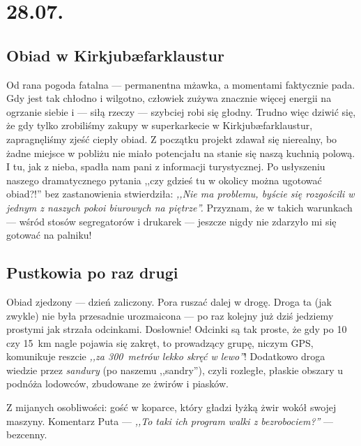 \chapter*{28.07.}

\section*{Obiad w Kirkjubæfarklaustur}

Od rana pogoda fatalna --- permanentna mżawka, a momentami faktycznie pada. Gdy jest tak chłodno i wilgotno, człowiek zużywa znacznie więcej energii na ogrzanie siebie i --- siłą rzeczy --- szybciej robi się głodny. Trudno więc dziwić się, że gdy tylko zrobiliśmy zakupy w superkarkecie w Kirkjubæfarklaustur, zapragnęliśmy zjeść ciepły obiad. Z początku projekt zdawał się nierealny, bo żadne miejsce w pobliżu nie miało potencjału na stanie się naszą kuchnią polową. I tu, jak z nieba, spadła nam pani z informacji turystycznej. Po usłyszeniu naszego dramatycznego pytania ,,czy gdzieś tu w okolicy można ugotować obiad?!'' bez zastanowienia stwierdziła: \emph{,,Nie ma problemu, byście się rozgościli w jednym z naszych pokoi biurowych na piętrze''.} Przyznam, że w takich warunkach --- wśród stosów segregatorów i drukarek --- jeszcze nigdy nie zdarzyło mi się gotować na palniku!


\section*{Pustkowia po raz drugi}

Obiad zjedzony --- dzień zaliczony. Pora ruszać dalej w drogę. Droga ta (jak zwykle) nie była przesadnie urozmaicona --- po raz kolejny już dziś jedziemy prostymi jak strzała odcinkami. Dosłownie! Odcinki są tak proste, że gdy po 10 czy 15~km nagle pojawia się zakręt, to prowadzący grupę, niczym GPS, komunikuje reszcie \emph{,,za 300~metrów lekko skręć w lewo''}! Dodatkowo droga wiedzie przez \emph{sandury} (po naszemu ,,sandry''), czyli rozległe, płaskie obszary u podnóża lodowców, zbudowane ze żwirów i piasków.

Z mijanych osobliwości: gość w koparce, który gładzi łyżką żwir wokół swojej maszyny. Komentarz Puta --- \emph{,,To taki ich program walki z bezrobociem?''} --- bezcenny.


